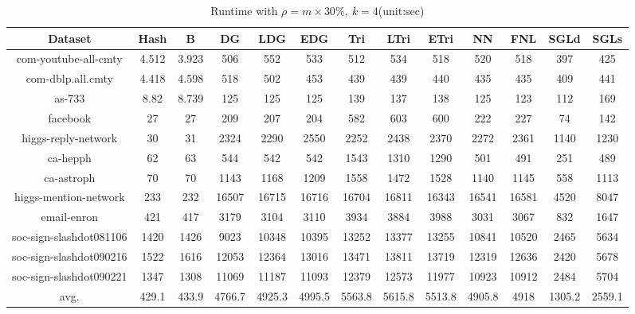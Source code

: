 \documentclass{sig-alternate-2013}
\begin{document}
\begin{table}[!hpp]
\centering
\caption{Runtime with $\rho = m\times 30\%,\ k=4$(unit:sec)}
\begin{tabular}{ccccccccccccc}
\hline
Dataset                     &Hash       &B          &DG         &LDG        &EDG        &Tri        &LTri       &ETri      &NN         &FNL        &SGLd   &SGLs\\
\hline
com-youtube-all-cmty		&4.512    	&3.923	    &506		&552		&533		&512		&534		&518		&520		&518		&397		&425\\
com-dblp.all.cmty			&4.418	    &4.598	    &518		&502		&453		&439		&439		&440		&435		&435		&409		&441\\
as-733						&8.82		&8.739	    &125		&125		&125		&139		&137		&138		&125		&123		&112		&169\\
facebook					&27			&27			&209		&207		&204		&582		&603		&600		&222		&227		&74		    &142\\
higgs-reply-network			&30			&31			&2324		&2290		&2550		&2252		&2438		&2370		&2272		&2361		&1140		&1230\\
ca-hepph					&62			&63			&544		&542		&542		&1543		&1310		&1290		&501		&491		&251		&489\\
ca-astroph					&70			&70			&1143		&1168		&1209		&1558		&1472		&1528		&1140		&1145		&558		&1113\\
higgs-mention-network		&233		&232		&16507	    &16715	    &16716	    &16704	    &16811	    &16343	    &16541	    &16581	    &4520		&8047\\
email-enron					&421		&417		&3179		&3104		&3110		&3934		&3884		&3988		&3031		&3067		&832		&1647\\
soc-sign-slashdot081106		&1420		&1426		&9023		&10348	    &10395	    &13252	    &13377	    &13255	    &10841	    &10520	    &2465		&5634\\
soc-sign-slashdot090216		&1522		&1616		&12053	    &12364	    &13016	    &13471	    &13811	    &13719	    &12319	    &12636	    &2420		&5678\\
soc-sign-slashdot090221		&1347		&1308		&11069	    &11187	    &11093	    &12379	    &12573	    &11977	    &10923	    &10912	    &2484		&5704\\
\hline
avg.                        &429.1	    &433.9   	&4766.7	    &4925.3	    &4995.5	    &5563.8	    &5615.8    	&5513.8    	&4905.8    	&4918	    &1305.2  	&2559.1\\

\hline
\end{tabular}
\end{table}
\end{document}
